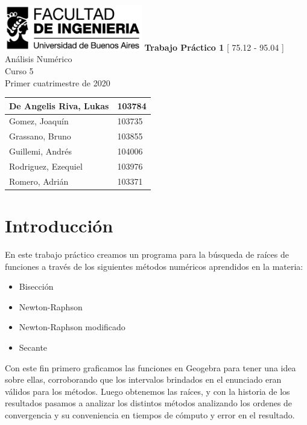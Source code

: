 \documentclass[titlepage,a4paper]{article}
\begin{document}
\begin{titlepage} %
	\hfill\includegraphics[width=6cm]{logofiuba.jpg}
    \centering
    \vfill
    \Huge \textbf{Trabajo Práctico 1}
    \vskip2cm
    \Large [ 75.12 - 95.04 ] Análisis Numérico\\
    Curso 5 \\ 
    Primer cuatrimestre de 2020\\
    \vfill
    \begin{tabular}{ | l | l | } %
      \hline
        De Angelis Riva, Lukas & 103784 \\ \hline
        Gomez, Joaquín & 103735 \\ \hline
        Grassano, Bruno & 103855 \\ \hline
        Guillemi, Andrés & 104006\\ \hline 
        Rodriguez, Ezequiel & 103976 \\ \hline
        Romero, Adrián & 103371 \\ \hline
  	\end{tabular}
    \vfill
    \vfill
    \vfill
\end{titlepage}

\tableofcontents %
\newpage

\section{Introducción}\label{sec:intro}
En este trabajo práctico creamos un programa para la búsqueda de raíces de funciones a través de los siguientes métodos numéricos aprendidos en la materia:
\begin{itemize}
    \item Bisección
    \item Newton-Raphson
    \item Newton-Raphson modificado
    \item Secante
\end{itemize}


Con este fin primero graficamos las funciones en Geogebra para tener una idea sobre ellas, corroborando que los intervalos brindados en el enunciado eran válidos para los métodos. Luego obtenemos las raíces, y con la historia de los resultados pasamos a analizar los distintos métodos analizando los ordenes de convergencia y su conveniencia en tiempos de cómputo y error en el resultado.
\end{document}
